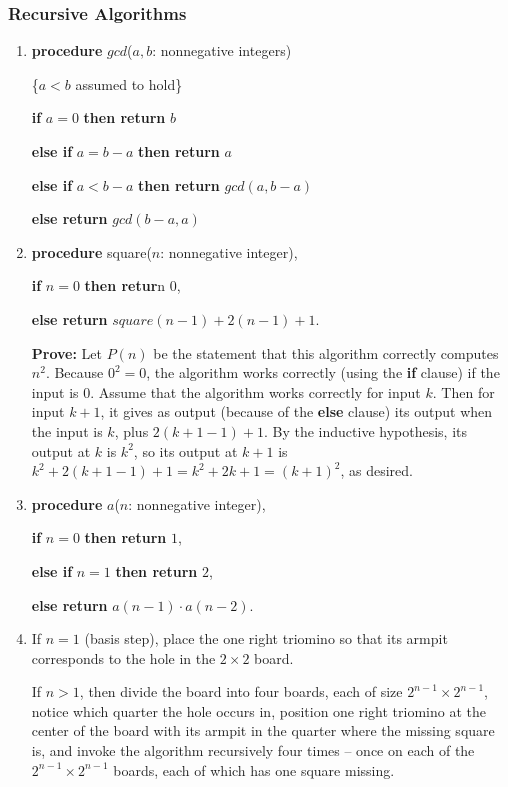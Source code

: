 \documentclass{../../cls/sig-alternate-05-2015}
\begin{document}
\subsubsection{Recursive Algorithms}
\begin{enumerate}
\item 
\textbf{procedure} $gcd$($a, b$: nonnegative integers)

\{$a < b$ assumed to hold\}

\textbf{if} $a = 0$ \textbf{then return} $b$

\textbf{else if} $a = b - a$ \textbf{then return} $a$

\textbf{else if} $a < b - a$ \textbf{then return} $gcd(a, b - a)$

\textbf{else return} $gcd(b - a, a)$


\item  \textbf{procedure} square($n$: nonnegative integer),

\textbf{if} $n = 0$ \textbf{then retur}n $0$,

\textbf{else return} $square (n - 1) + 2(n - 1) + 1$.

\textbf{Prove:} Let $P (n)$ be the statement that this algorithm correctly computes $n^2$. Because $0^2 = 0$, the algorithm works correctly
(using the \textbf{if} clause) if the input is $0$. Assume that the algorithm works correctly for input $k$. Then for input $k + 1$, it
gives as output (because of the \textbf{else} clause) its output when
the input is $k$, plus $2(k + 1 - 1) + 1$. By the inductive
hypothesis, its output at $k$ is $k^2$, so its output at $k + 1$ is
$k^2 + 2(k + 1 - 1) + 1 = k^2 + 2k + 1 = (k + 1)^2$, as desired.



\item 
\textbf{procedure} $a$($n$: nonnegative integer),

\textbf{if} $n = 0$ \textbf{then return} $1$,

\textbf{else if} $n = 1$ \textbf{then return} $2$,

\textbf{else return} $a(n - 1) \cdot a(n - 2)$.


    
\item If $n = 1$ (basis step),
place the one right triomino so that its armpit corresponds to the hole in the $2 \times 2$ board.

If $n > 1$,
then divide the board into four boards, each of size $2^{n - 1} \times 2^{n - 1}$,
notice which quarter the hole occurs in,
position one right triomino at the center of the board with its armpit in the quarter where the missing square is,
and invoke the algorithm recursively four times -- once on each of the $2^{n - 1} \times 2^{n - 1}$ boards,
each of which has one square missing.


\end{enumerate}
\end{document}
